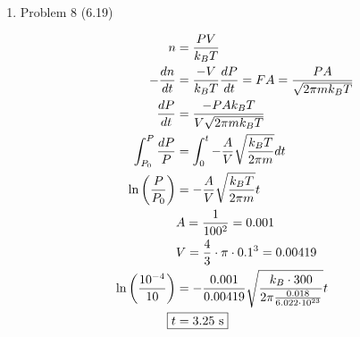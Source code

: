 \documentclass[12pt]{article}
\begin{document}
\begin{enumerate}
    \newpage
    \item Problem 8 (6.19)
    
    \begin{align*}
        n &= \frac{PV}{k_BT} \\
        -\frac{dn}{dt} &= \frac{-V}{k_BT} \frac{dP}{dt} = FA = \frac{PA}{\sqrt{2\pi mk_BT}} \\
        \frac{dP}{dt} &= \frac{-PAk_BT}{V\sqrt{2\pi mk_BT}} \\
        \int_{P_0}^P \frac{dP}{P} &= \int_0^t -\frac{A}{V} \sqrt{\frac{k_BT}{2\pi m}} dt \\
        \ln\left(\frac{P}{P_0}\right) &= -\frac{A}{V} \sqrt{\frac{k_BT}{2\pi m}} t \\
        & A = \frac{1}{100^2} = 0.001 \\
        & V = \frac{4}{3} \cdot \pi \cdot 0.1^3 = 0.00419 \\
        \ln\left(\frac{10^{-4}}{10}\right) &= -\frac{0.001}{0.00419} \sqrt{\frac{k_B\cdot300}{2\pi \frac{0.018}{6.022\cdot10^{23}}}} t \\
        \Aboxed{t &= 3.25 \text{ s}}
    \end{align*}
    
    

\end{enumerate}
\end{document}
